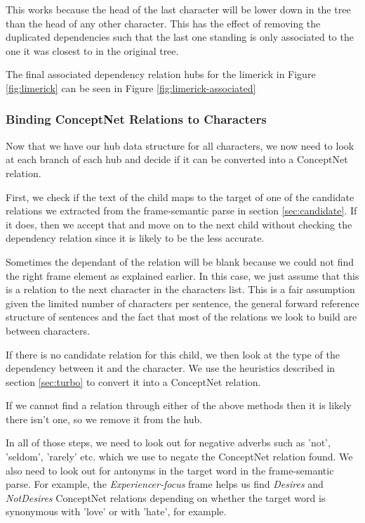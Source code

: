 This works because the head of the last character will be lower down in the tree than the head of any other character. This has the effect of removing the duplicated dependencies such that the last one standing is only associated to the one it was closest to in the original tree.

The final associated dependency relation hubs for the limerick in Figure \ref{fig:limerick} can be seen in Figure \ref{fig:limerick-associated}

\subsubsection{Binding ConceptNet Relations to Characters}
	
Now that we have our hub data structure for all characters, we now need to look at each branch of each hub and decide if it can be converted into a ConceptNet relation.

First, we check if the text of the child maps to the target of one of the candidate relations we extracted from the frame-semantic parse in section \ref{sec:candidate}. If it does, then we accept that and move on to the next child without checking the dependency relation since it is likely to be the less accurate. 

Sometimes the dependant of the relation will be blank because we could not find the right frame element as explained earlier. In this case, we just assume that this is a relation to the next character in the characters list. This is a fair assumption given the limited number of characters per sentence, the general forward reference structure of sentences and the fact that most of the relations we look to build are between characters.

If there is no candidate relation for this child, we then look at the type of the dependency between it and the character. We use the heuristics described in section \ref{sec:turbo} to convert it into a ConceptNet relation.

If we cannot find a relation through either of the above methods then it is likely there isn't one, so we remove it from the hub.

In all of those steps, we need to look out for negative adverbs such as 'not', 'seldom', 'rarely' etc. which we use to negate the ConceptNet relation found. We also need to look out for antonyms in the target word in the frame-semantic parse. For example, the \textit{Experiencer-focus} frame helps us find \textit{Desires} and \textit{NotDesires} ConceptNet relations depending on whether the target word is synonymous with 'love' or with 'hate', for example.

